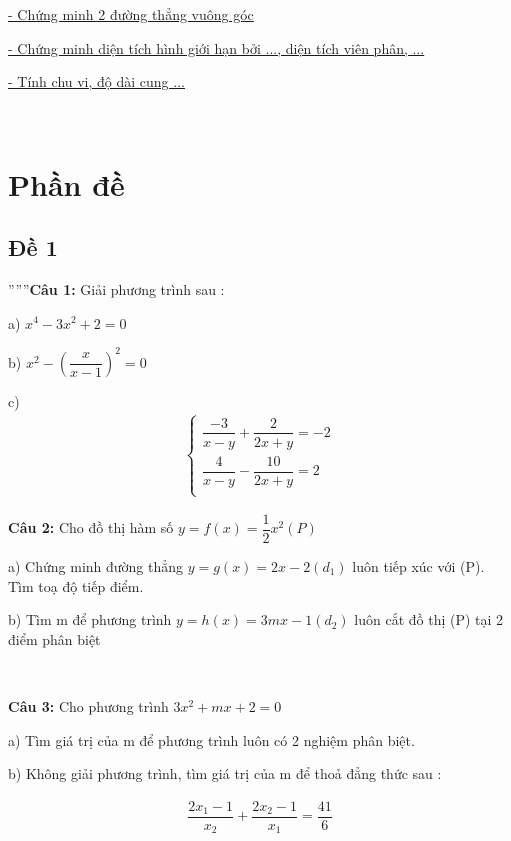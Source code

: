 \documentclass[12pt]{article}
\begin{document}
\underline{- Chứng minh 2 đường thẳng vuông góc} \par

\underline{- Chứng minh diện tích hình giới hạn bởi ..., diện tích viên phân, ...} \par

\underline{- Tính chu vi, độ dài cung ...} \par

\     

\break  

\section{Phần đề}

\subsection{Đề 1}
''''''\textbf{Câu 1:} Giải phương trình sau : \par
a) $x^4-3x^2+2=0$ \par
b) $x^2 - (\dfrac{x}{x-1})^2 = 0$ \par
c)  \begin{align}
    \begin{cases}
        \dfrac{-3}{x-y}+\dfrac{2}{2x+y}=-2 \\
        \dfrac{4}{x-y}-\dfrac{10}{2x+y}=2 \\
    \end{cases}
\end{align}
 
\textbf{Câu 2:} Cho đồ thị hàm số $y=f(x)=\dfrac{1}{2}x^2 (P)$ \par
a) Chứng minh đường thẳng $y=g(x)=2x-2 (d_1)$ luôn tiếp xúc với (P). Tìm toạ độ tiếp điểm.\par
b) Tìm m để phương trình $y=h(x)=3mx-1 (d_2)$ luôn cắt đồ thị (P) tại 2 điểm phân biệt \par

\

\textbf{Câu 3:} Cho phương trình $3x^2 + mx + 2 = 0$ \par
a) Tìm giá trị của m để phương trình luôn có 2 nghiệm phân biệt.\par
b) Không giải phương trình, tìm giá trị của m để thoả đẳng thức sau : \par

\begin{align}
\dfrac{2x_1-1}{x_2} + \dfrac{2x_2-1}{x_1}=\dfrac{41}{6} 
\end{align}
\end{document}
